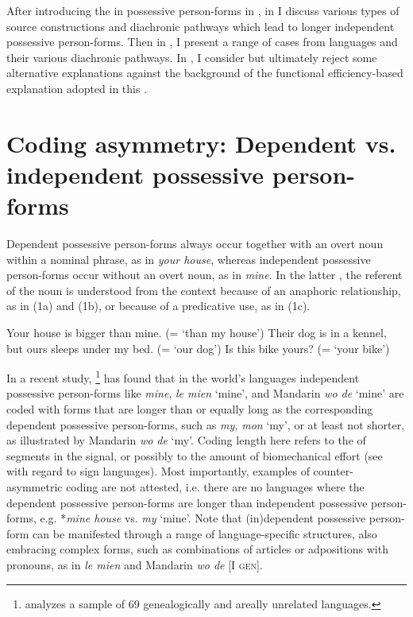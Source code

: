 \documentclass[output=paper]{langsci/langscibook}
\begin{document}
After introducing the  in possessive person-forms in , in  I discuss various types of source constructions and diachronic pathways which lead to longer independent possessive person-forms. Then in , I present a range of cases from  languages and their various diachronic pathways. In , I consider but ultimately reject some alternative explanations against the background of the functional efficiency-based explanation adopted in this . 

\section{Coding asymmetry: Dependent vs. independent possessive person-forms}\label{sec:michaelis:2} 

Dependent possessive person-forms always occur together with an overt noun within a nominal phrase, as in \textit{your house}, whereas independent possessive person-forms occur without an overt noun, as in \textit{mine}. In the latter , the referent of the noun is understood from the context because of an anaphoric relationship, as in (1a) and (1b), or because of a predicative use, as in (1c).  

\ea
{}
\ea
Your house is bigger than mine. (= ‘than my house’)
\ex
 Their dog is in a kennel, but ours sleeps under my bed. (= ‘our dog’)
\ex 
 Is this bike yours? (= ‘your bike’)
\z
\z

In a recent study, \citet{Ye2017}{\-}\footnote{\citet{Ye2017} analyzes a sample of 69 genealogically and areally unrelated languages.} has found that in the world's languages independent possessive person-forms like  \textit{mine},  \textit{le mien} ‘mine’, and Mandarin \textit{wo de} ‘mine’ are coded with forms that are longer than or equally long as the corresponding dependent possessive person-forms, such as  \textit{my,}  \textit{mon} ‘my’, or at least not shorter, as illustrated by Mandarin \textit{wo de} ‘my’. Coding length here refers to the  of segments in the signal, or possibly to the amount of biomechanical effort (see \citealt{NapoliEtAl2014} with regard to sign languages). Most importantly, examples of counter-asymmetric coding are not attested, i.e. there are no languages where the dependent possessive person-forms are longer than independent possessive person-forms, e.g. *\textit{mine house} vs. \textit{my} ‘mine’. Note that (in)dependent possessive person-form can be manifested through a range of language-specific structures, also embracing complex forms, such as combinations of articles or adpositions with pronouns, as in  \textit{le mien} and Mandarin \textit{wo de} [I \textsc{gen}]. 
\end{document}
